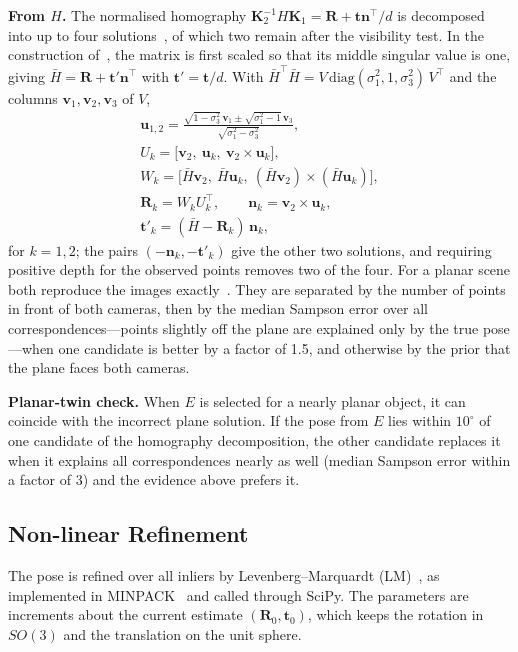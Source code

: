 \documentclass[journal]{IEEEtran}
\newcommand{\R}{\mathbf{R}}
\newcommand{\tv}{\mathbf{t}}
\newcommand{\K}{\mathbf{K}}
\newcommand{\n}{\mathbf{n}}
\begin{document}
\textbf{From $H$.} The normalised homography $\K_2^{-1}H\K_1=\R+\tv\n^\top/d$ is decomposed into up to four solutions~\cite{malis}, of which two remain after the visibility test. In the construction of~\cite{ma2004}, the matrix is first scaled so that its middle singular value is one, giving $\bar H=\R+\tv'\n^\top$ with $\tv'=\tv/d$. With $\bar H^\top\bar H=V\,\mathrm{diag}(\sigma_1^2,1,\sigma_3^2)\,V^\top$ and the columns $\mathbf{v}_1,\mathbf{v}_2,\mathbf{v}_3$ of $V$,
\begin{gather}
  \mathbf{u}_{1,2}=\frac{\sqrt{1-\sigma_3^2}\,\mathbf{v}_1\pm\sqrt{\sigma_1^2-1}\,\mathbf{v}_3}{\sqrt{\sigma_1^2-\sigma_3^2}},\\
  U_k=\big[\mathbf{v}_2,\ \mathbf{u}_k,\ \mathbf{v}_2\times\mathbf{u}_k\big],\\
  W_k=\big[\bar H\mathbf{v}_2,\ \bar H\mathbf{u}_k,\ (\bar H\mathbf{v}_2)\times(\bar H\mathbf{u}_k)\big],\\
  \R_k=W_kU_k^\top,\qquad \n_k=\mathbf{v}_2\times\mathbf{u}_k,\\
  \tv'_k=(\bar H-\R_k)\,\n_k ,
\end{gather}
for $k=1,2$; the pairs $(-\n_k,-\tv'_k)$ give the other two solutions, and requiring positive depth for the observed points removes two of the four. For a planar scene both reproduce the images exactly~\cite{faugeras}. They are separated by the number of points in front of both cameras, then by the median Sampson error over all correspondences---points slightly off the plane are explained only by the true pose---when one candidate is better by a factor of 1.5, and otherwise by the prior that the plane faces both cameras.

\textbf{Planar-twin check.} When $E$ is selected for a nearly planar object, it can coincide with the incorrect plane solution. If the pose from $E$ lies within $10^\circ$ of one candidate of the homography decomposition, the other candidate replaces it when it explains all correspondences nearly as well (median Sampson error within a factor of 3) and the evidence above prefers it.

\subsection{Non-linear Refinement}
The pose is refined over all inliers by Levenberg--Marquardt (LM)~\cite{levenberg,marquardt}, as implemented in MINPACK~\cite{more1978} and called through SciPy. The parameters are increments about the current estimate $(\R_0,\tv_0)$, which keeps the rotation in $SO(3)$ and the translation on the unit sphere.
\end{document}
